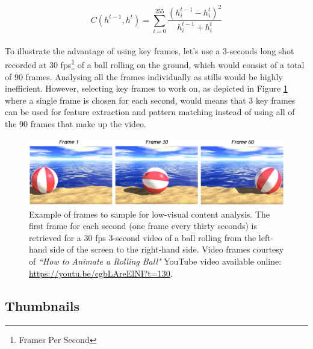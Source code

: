 \begingroup \Large \begin{equation} \label{eq:chisquare}
    C(h^{t-1}, h^{t}) = \sum_{i=0}^{255} \frac{(h_{i}^{t-1} - h_{i}^{t})^2}{h_{i}^{t-1} + h_{i}^{t}}
\end{equation} \endgroup \\

To illustrate the advantage of using key frames, let's use a 3-seconds long shot recorded at 30 fps\footnote{Frames Per Second} of a ball rolling on the ground, which would consist of a total of 90 frames. Analysing all the frames individually as stills would be highly inefficient. However, selecting key frames to work on, as depicted in Figure \ref{fig:rolling_ball} where a single frame is chosen for each second, would means that 3 key frames can be used for feature extraction and pattern matching instead of using all of the 90 frames that make up the video.\\

\begin{figure}[h]
\centerline{\includegraphics[width=\textwidth]{figures/ball_rolling.jpg}}
\caption{\label{fig:rolling_ball}Example of frames to sample for low-visual content analysis. The first frame for each second (one frame every thirty seconds) is retrieved for a 30 fps 3-second video of a ball rolling from the left-hand side of the screen to the right-hand side. Video frames courtesy of \textit{``How to Animate a Rolling Ball"} YouTube video available online: \url{https://youtu.be/cgbLAreElNI?t=130}.}
\end{figure}


\subsection{Thumbnails}

